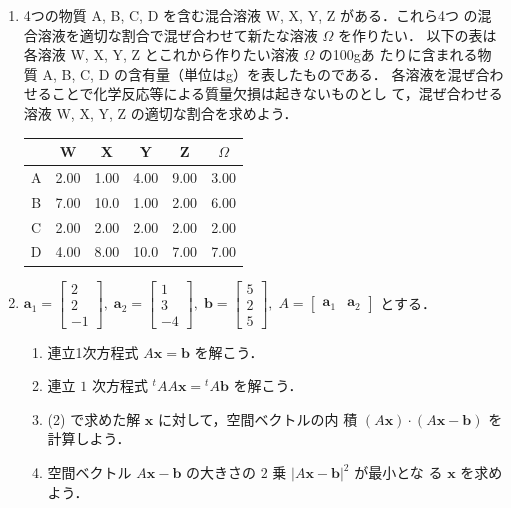 \documentclass[11pt, uplatex, dvipdfmx]{jsarticle}
\begin{document}
\begin{enumerate}
\item 4つの物質 A, B, C, D を含む混合溶液 W, X, Y, Z がある．これら4つ
  の混合溶液を適切な割合で混ぜ合わせて新たな溶液 $\Omega$ を作りたい．
  以下の表は各溶液 W, X, Y, Z とこれから作りたい溶液 $\Omega$ の100gあ
  たりに含まれる物質 A, B, C, D の含有量（単位はg）を表したものである．
  各溶液を混ぜ合わせることで化学反応等による質量欠損は起きないものとし
  て，混ぜ合わせる溶液 W, X, Y, Z の適切な割合を求めよう．
\begin{table}[h]
  \centering
  \begin{tabular}{ccccc|c}
    & W & X & Y & Z & $\Omega$\\ \hline
    A & 2.00 & 1.00 & 4.00 & 9.00 & 3.00\\ \hline
    B & 7.00 & 10.0 & 1.00 & 2.00 & 6.00\\ \hline  
    C & 2.00 & 2.00 & 2.00 & 2.00 & 2.00 \\ \hline
    D & 4.00 & 8.00 & 10.0 & 7.00 & 7.00\\ 
  \end{tabular}
\end{table}

  
\item $\bm{a}_1 = \left[
    \begin{array}{r}
      2\\
      2\\
      -1
    \end{array}
  \right], \; \bm{a}_2=\left[
    \begin{array}{r}
      1\\
      3\\
      -4
    \end{array}
  \right], \; \bm{b} = \left[
    \begin{array}{r}
      5\\
      2\\
      5
    \end{array}
  \right], \; A=\left[
    \begin{array}{cc}
      \bm{a}_1 & \bm{a}_2
    \end{array}
  \right]$ とする．
      
  \vspace{1zh}

  
  \begin{enumerate}[(1)]
    \setlength{\itemsep}{1ex}
    
  \item 連立1次方程式 $A\bm{x} = \bm{b}$ を解こう．

  \item 連立 $1$ 次方程式 ${}^{t}A A\bm{x} = {}^{t}A \bm{b}$ を解こう．

  \item (2) で求めた解 $\bm{x}$ に対して，空間ベクトルの内
    積 $(A\bm{x}) \cdot (A\bm{x} -\bm{b})$ を計算しよう．

  \item 空間ベクトル $A\bm{x}-\bm{b}$ の大きさの $2$ 乗 $|A\bm{x} - \bm{b}|^2$ が最小とな
    る $\bm{x}$ を求めよう．
  \end{enumerate}
    
\end{enumerate}
\end{document}
